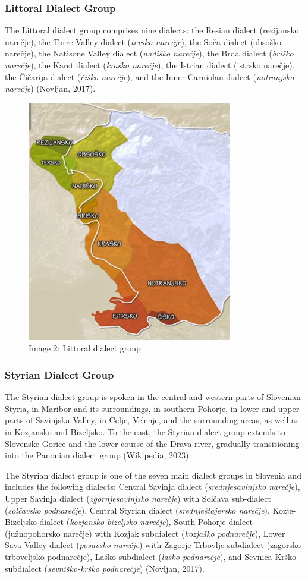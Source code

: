\documentclass[fleqn,moreauthors,10pt]{ds_report}
\begin{document}
\subsubsection{Littoral Dialect Group}

    The Littoral dialect group comprises nine dialects: the Resian dialect (rezijansko narečje), the Torre Valley dialect (\textit{tersko narečje}), the Soča dialect (obsoško narečje), the Natisone Valley dialect (\textit{nadiško narečje}), the Brda dialect (\textit{briško narečje}), the Karst dialect (\textit{kraško narečje}), the Istrian dialect (istrsko narečje), the Čičarija dialect (\textit{čiško narečje}), and the Inner Carniolan dialect (\textit{notranjsko narečje}) (Novljan, 2017).

\begin{figure}
    \centering
    \includegraphics[width=0.5\linewidth]{Littoral.png}
    \caption{Image 2: Littoral dialect group
}
    \label{fig:map}
\end{figure}


\subsubsection{Styrian Dialect Group}

    The Styrian dialect group is spoken in the central and western parts of Slovenian Styria, in Maribor and its surroundings, in southern Pohorje, in lower and upper parts of Savinjska Valley, in Celje, Velenje, and the surrounding areas, as well as in Kozjansko and Bizeljsko. To the east, the Styrian dialect group extends to Slovenske Gorice and the lower course of the Drava river, gradually transitioning into the Panonian dialect group (Wikipedia, 2023).

    The Styrian dialect group is one of the seven main dialect groups in Slovenia and includes the following dialects: Central Savinja dialect (\textit{srednjesavinjsko narečje}), Upper Savinja dialect (\textit{zgornjesavinjsko narečje}) with Solčava sub-dialect (\textit{solčavsko podnarečje}), Central Styrian dialect (\textit{srednještajersko narečje}), Kozje-Bizeljsko dialect (\textit{kozjansko-bizeljsko narečje}), South Pohorje dialect (južnopohorsko narečje) with Kozjak subdialect (\textit{kozjaško podnarečje}), Lower Sava Valley dialect (\textit{posavsko narečje}) with Zagorje-Trbovlje subdialect (zagorsko-trboveljsko podnarečje), Laško subdialect (\textit{laško podnarečje}), and Sevnica-Krško subdialect (\textit{sevniško-krško podnarečje}) (Novljan, 2017). 
    
\end{document}
